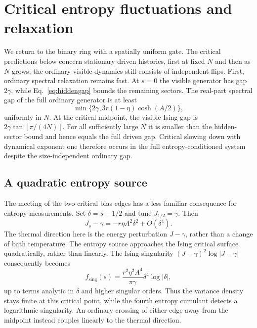 \documentclass[aps,pre,reprint,amsmath,amssymb,longbibliography,floatfix]{revtex4-2}
\begin{document}
\section{Critical entropy fluctuations and relaxation}
\label{sec:critical}
We return to the binary ring with a spatially uniform gate. The critical
predictions below concern stationary driven histories, first at fixed $N$
and then as $N$ grows; the ordinary visible dynamics still consists of
independent flips. First, ordinary spectral relaxation remains fast. At $s=0$
the visible generator has gap $2\gamma$, while Eq.~\eqref{eq:hiddengap}
bounds the remaining sectors. The real-part spectral gap of the full
ordinary generator is at least
\begin{equation}
 \min\{2\gamma,3r(1-\eta)\cosh(A/2)\},
 \label{eq:ordinarygap}
\end{equation}
uniformly in $N$. At the critical midpoint, the visible Ising gap is
$2\gamma\tan\left[\pi/(4N)\right]$. For all sufficiently large $N$ it is smaller
than the hidden-sector bound and hence equals the full driven gap.
Critical slowing down with dynamical exponent one therefore occurs in
the full entropy-conditioned system despite the size-independent
ordinary gap.

\subsection{A quadratic entropy source}
The meeting of the two critical bias edges has a less familiar consequence
for entropy measurements. Set $\delta=s-1/2$ and tune $J_{1/2}=\gamma$.
Then
\begin{equation}
 J_s-\gamma=-r\eta A^2\delta^2+O(\delta^4).
 \label{eq:tangent}
\end{equation}
The thermal direction here is the energy perturbation $J-\gamma$,
rather than a change of bath temperature. The entropy source approaches
the Ising critical surface quadratically,
rather than linearly. The Ising singularity
$(J-\gamma)^2\log|J-\gamma|$ consequently becomes
\begin{equation}
 f_{\mathrm{sing}}(s)=\frac{r^2\eta^2A^4}{\pi\gamma}
 \delta^4\log|\delta|,
 \label{eq:fourthlog}
\end{equation}
up to terms analytic in $\delta$ and higher singular orders.
Thus the variance density stays finite at this critical point, while
the fourth entropy cumulant detects a logarithmic singularity.
An ordinary crossing of either edge away from the midpoint instead
couples linearly to the thermal direction.
\end{document}

